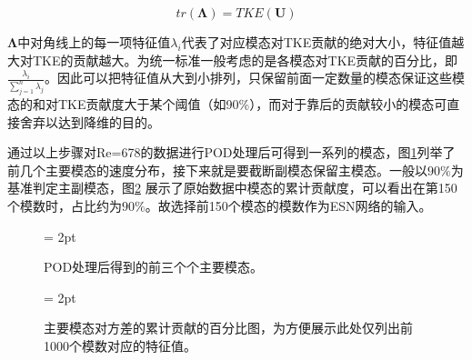 $$
tr(\bm \Lambda) = TKE(\bm U)
$$

$\bm \Lambda$中对角线上的每一项特征值$\lambda_{i}$代表了对应模态对TKE贡献的绝对大小，特征值越大对TKE的贡献越大。为统一标准一般考虑的是各模态对TKE贡献的百分比，即$\frac{\lambda_{i}}{\sum_{j=1}^{n}\lambda_{j}}$。因此可以把特征值从大到小排列，只保留前面一定数量的模态保证这些模态的和对TKE贡献度大于某个阈值（如90\%），而对于靠后的贡献较小的模态可直接舍弃以达到降维的目的。

通过以上步骤对Re=678的数据进行POD处理后可得到一系列的模态，图\ref{fig:main_mode_sample}列举了前几个主要模态的速度分布，接下来就是要截断副模态保留主模态。一般以$90\%$为基准判定主副模态，图\ref{fig:main_mode} 展示了原始数据中模态的累计贡献度，可以看出在第150个模数时，占比约为$90\%$。故选择前150个模态的模数作为ESN网络的输入。
\begin{figure}[htb]
	\subfigbottomskip = 2pt
	\begin{minipage}[h]{0.33\linewidth}
	\centering
	\end{minipage}
	\begin{minipage}[h]{0.33\linewidth}
	\centering
	\end{minipage}
	\begin{minipage}[h]{0.33\linewidth}
	\centering
	\end{minipage}
	\caption{POD处理后得到的前三个个主要模态。}
\label{fig:main_mode_sample}
\end{figure}

\begin{figure}[H]
	\subfigbottomskip = 2pt
	\begin{minipage}[h]{\linewidth}
	\centering
	\end{minipage}
	\quad
	\caption{主要模态对方差的累计贡献的百分比图，为方便展示此处仅列出前1000个模数对应的特征值。}
\label{fig:main_mode}
\end{figure}

